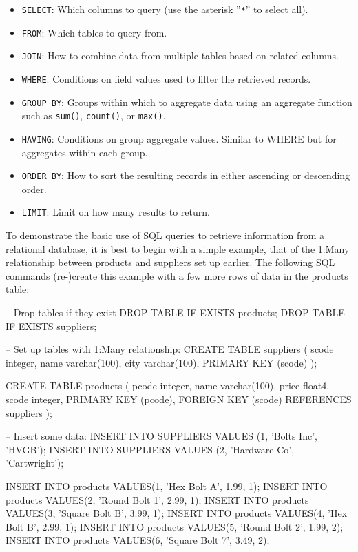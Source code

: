 \begin{itemize}
 \item \texttt{SELECT}: Which columns to query (use the asterisk ''\texttt{*}'' to select all).
 \item \texttt{FROM}: Which tables to query from.
 \item \texttt{JOIN}: How to combine data from multiple tables based on related columns.
 \item \texttt{WHERE}: Conditions on field values used to filter the retrieved records.
 \item \texttt{GROUP BY}: Groups within which to aggregate data using an aggregate function such as \texttt{sum()}, \texttt{count()}, or \texttt{max()}.
 \item \texttt{HAVING}: Conditions on group aggregate values. Similar to WHERE but for aggregates within each group.
 \item \texttt{ORDER BY}: How to sort the resulting records in either ascending or descending order.
 \item \texttt{LIMIT}: Limit on how many results to return.
\end{itemize}

To demonstrate the basic use of SQL queries to retrieve information from a relational database, it is best to begin with a simple example, that of the 1:Many relationship between products and suppliers set up earlier. The following SQL commands (re-)create this example with a few more rows of data in the products table:

\begin{sqlcode}
-- Drop tables if they exist
DROP TABLE IF EXISTS products;
DROP TABLE IF EXISTS suppliers;

-- Set up tables with 1:Many relationship:
CREATE TABLE suppliers (
scode integer,
name varchar(100),
city varchar(100),
PRIMARY KEY (scode) );

CREATE TABLE products (
pcode	integer,
name	varchar(100),
price	float4,
scode   integer,
PRIMARY KEY (pcode),
FOREIGN KEY (scode) REFERENCES suppliers );
\end{sqlcode}

\begin{sqlcode}
-- Insert some data:
INSERT INTO SUPPLIERS VALUES (1, 'Bolts Inc', 'HVGB');
INSERT INTO SUPPLIERS VALUES (2, 'Hardware Co', 'Cartwright');

INSERT INTO products VALUES(1, 'Hex Bolt A', 1.99, 1);
INSERT INTO products VALUES(2, 'Round Bolt 1', 2.99, 1);
INSERT INTO products VALUES(3, 'Square Bolt B', 3.99, 1);
INSERT INTO products VALUES(4, 'Hex Bolt B', 2.99, 1);
INSERT INTO products VALUES(5, 'Round Bolt 2', 1.99, 2);
INSERT INTO products VALUES(6, 'Square Bolt 7', 3.49, 2);
\end{sqlcode}

